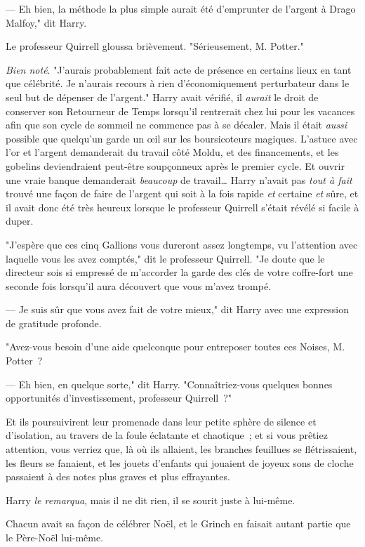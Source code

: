 --- Eh bien, la méthode la plus simple aurait été d'emprunter de l'argent à Drago Malfoy," dit Harry.

Le professeur Quirrell gloussa brièvement. "Sérieusement, M. Potter."

\emph{Bien noté}. "J'aurais probablement fait acte de présence en certains lieux en tant que célébrité. Je n'aurais recours à rien d'économiquement perturbateur dans le seul but de dépenser de l'argent." Harry avait vérifié, il \emph{aurait} le droit de conserver son Retourneur de Temps lorsqu'il rentrerait chez lui pour les vacances afin que son cycle de sommeil ne commence pas à se décaler. Mais il était \emph{aussi} possible que quelqu'un garde un œil sur les boursicoteurs magiques. L'astuce avec l'or et l'argent demanderait du travail côté Moldu, et des financements, et les gobelins deviendraient peut-être soupçonneux après le premier cycle. Et ouvrir une vraie banque demanderait \emph{beaucoup} de travail… Harry n'avait pas \emph{tout à fait} trouvé une façon de faire de l'argent qui soit à la fois rapide \emph{et} certaine \emph{et} sûre, et il avait donc été très heureux lorsque le professeur Quirrell s'était révélé si facile à duper.

"J'espère que ces cinq Gallions vous dureront assez longtemps, vu l'attention avec laquelle vous les avez comptés," dit le professeur Quirrell. "Je doute que le directeur sois si empressé de m'accorder la garde des clés de votre coffre-fort une seconde fois lorsqu'il aura découvert que vous m'avez trompé.

--- Je suis sûr que vous avez fait de votre mieux," dit Harry avec une expression de gratitude profonde.

"Avez-vous besoin d'une aide quelconque pour entreposer toutes ces Noises, M. Potter~?

--- Eh bien, en quelque sorte," dit Harry. "Connaîtriez-vous quelques bonnes opportunités d'investissement, professeur Quirrell~?"

Et ils poursuivirent leur promenade dans leur petite sphère de silence et d'isolation, au travers de la foule éclatante et chaotique~; et si vous prêtiez attention, vous verriez que, là où ils allaient, les branches feuillues se flétrissaient, les fleurs se fanaient, et les jouets d'enfants qui jouaient de joyeux sons de cloche passaient à des notes plus graves et plus effrayantes.

Harry \emph{le remarqua}, mais il ne dit rien, il se sourit juste à lui-même.

Chacun avait sa façon de célébrer Noël, et le Grinch en faisait autant partie que le Père-Noël lui-même. 

